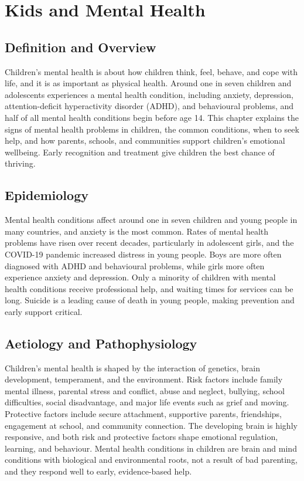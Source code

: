 \chapter{Kids and Mental Health}

\section*{Definition and Overview}
Children's mental health is about how children think, feel, behave, and cope with life, and it is as important as physical health. Around one in seven children and adolescents experiences a mental health condition, including anxiety, depression, attention-deficit hyperactivity disorder (ADHD), and behavioural problems, and half of all mental health conditions begin before age 14. This chapter explains the signs of mental health problems in children, the common conditions, when to seek help, and how parents, schools, and communities support children's emotional wellbeing. Early recognition and treatment give children the best chance of thriving.

\section*{Epidemiology}
Mental health conditions affect around one in seven children and young people in many countries, and anxiety is the most common. Rates of mental health problems have risen over recent decades, particularly in adolescent girls, and the COVID-19 pandemic increased distress in young people. Boys are more often diagnosed with ADHD and behavioural problems, while girls more often experience anxiety and depression. Only a minority of children with mental health conditions receive professional help, and waiting times for services can be long. Suicide is a leading cause of death in young people, making prevention and early support critical.

\section*{Aetiology and Pathophysiology}
Children's mental health is shaped by the interaction of genetics, brain development, temperament, and the environment. Risk factors include family mental illness, parental stress and conflict, abuse and neglect, bullying, school difficulties, social disadvantage, and major life events such as grief and moving. Protective factors include secure attachment, supportive parents, friendships, engagement at school, and community connection. The developing brain is highly responsive, and both risk and protective factors shape emotional regulation, learning, and behaviour. Mental health conditions in children are brain and mind conditions with biological and environmental roots, not a result of bad parenting, and they respond well to early, evidence-based help.

